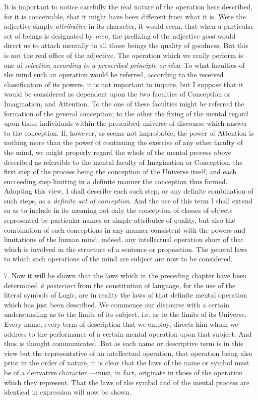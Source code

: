 \documentclass[oneside]{book}
\begin{document}
It is important to notice carefully the real nature of the operation
here described, for it is conceivable, that it might have
been different from what it is. Were the adjective simply \textit{attributive}
in its character, it would seem, that when a particular set
of beings is designated by \textit{men}, the prefixing of the adjective
\textit{good} would direct us to attach mentally to all those beings the
quality of goodness. But this is not the real office of the adjective.
The operation which we really perform is one of \textit{selection
according to a prescribed principle or idea}. To what faculties
of the mind such an operation would be referred, according
to the received classification of its powers, it is not important to
inquire, but I suppose that it would be considered as dependent
upon the two faculties of Conception or Imagination, and Attention.
To the one of these faculties might be referred the formation
of the general conception; to the other the fixing of the
mental regard upon those individuals within the prescribed universe
of discourse which answer to the conception. If, however,
as seems not improbable, the power of Attention is nothing more
than the power of continuing the exercise of any other faculty of the
mind, we might properly regard the whole of the mental process
above described as referrible to the mental faculty of Imagination
or Conception, the first step of the process being the conception
of the Universe itself, and each succeeding step limiting in a definite
manner the conception thus formed. Adopting this view, I
shall describe each such step, or any definite combination of such
steps, as a \textit{definite act of conception}. And the use of this term I
shall extend so as to include in its meaning not only the conception
of classes of objects represented by particular names or simple
attributes of quality, but also the combination of such conceptions
in any manner consistent with the powers and limitations
of the human mind; indeed, any intellectual operation short
of that which is involved in the structure of a sentence or proposition.
The general laws to which such operations of the mind
are subject are now to be considered.

7. Now it will be shown that the laws which in the preceding
chapter have been determined \textit{\`{a} posteriori} from the constitution
of language, for the use of the literal symbols of Logic,
are in reality the laws of that definite mental operation which
has just been described. We commence our discourse with a
certain understanding as to the limits of its subject, i.e. as to
the limits of its Universe. Every name, every term of description
that we employ, directs him whom we address to the performance
of a certain mental operation upon that subject. And
thus is thought communicated. But as each name or descriptive
term is in this view but the representative of an intellectual operation,
that operation being also prior in the order of nature, it
is clear that the laws of the name or symbol must be of a derivative
character,---must, in fact, originate in those of the operation
which they represent. That the laws of the symbol and of the
mental process are identical in expression will now be shown.
\end{document}
